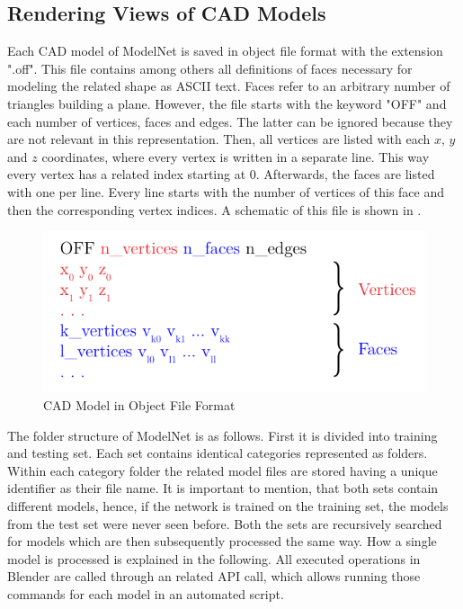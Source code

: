\subsection{Rendering Views of CAD Models}
\label{sec:dataset-rendering}
Each CAD model of ModelNet is saved in object file format with the extension ".off".
This file contains among others all definitions of faces necessary for modeling the related shape as ASCII text.
Faces refer to an arbitrary number of triangles building a plane.
However, the file starts with the keyword "OFF" and each number of vertices, faces and edges.
The latter can be ignored because they are not relevant in this representation.
Then, all vertices are listed with each $x$, $y$ and $z$ coordinates, where every vertex is written in a separate line.
This way every vertex has a related index starting at 0.
Afterwards, the faces are listed with one per line.
Every line starts with the number of vertices of this face and then the corresponding vertex indices.
A schematic of this file is shown in .
\begin{figure}
	\centering
	\includegraphics[]{images/off.pdf}
	\caption{CAD Model in Object File Format}
	\label{fig:off}
\end{figure}

The folder structure of ModelNet is as follows.
First it is divided into training and testing set.
Each set contains identical categories represented as folders.
Within each category folder the related model files are stored having a unique identifier as their file name.
It is important to mention, that both sets contain different models, hence, if the network is trained on the training set, the models from the test set were never seen before.
Both the sets are recursively searched for models which are then subsequently processed the same way.
How a single model is processed is explained in the following.
All executed operations in Blender are called through an related API call, which allows running those commands for each model in an automated script.

